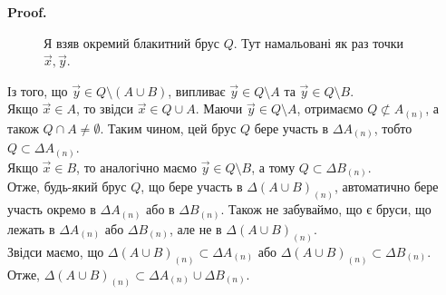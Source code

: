 \documentclass[a4paper, 10pt]{article}
\makeatletter
\def\qed{$\blacksquare$}
\theoremstyle{theoremdd}
\theoremstyle{theoremdd}
\theoremstyle{theoremdd}
\theoremstyle{theoremdd}
\theoremstyle{theoremdd}
\theoremstyle{theoremdd}
\theoremstyle{theoremdd}
\theoremstyle{theoremdd}
\renewenvironment{proof}[1][Proof.\\]{\par
\pushQED{\hfill \qed}%
\normalfont \topsep6\p@\@plus6\p@\relax
\trivlist
\item\relax
{\bfseries
#1\@addpunct{.}}\hspace\labelsep\ignorespaces
}{%
\popQED\endtrivlist\@endpefalse
}
\makeatother
\begin{document}
\begin{proof}
\begin{enumerate}[wide=0pt,label={\arabic*)}]
\begin{figure}[H]
\caption*{Я взяв окремий блакитний брус $Q$. Тут намальовані як раз точки $\vec{x},\vec{y}$.}
\end{figure}

Із того, що $\vec{y} \in Q \setminus (A \cup B)$, випливає $\vec{y} \in Q \setminus A$ та $\vec{y} \in Q \setminus B$.\\
Якщо $\vec{x} \in A$, то звідси $\vec{x} \in Q \cup A$. Маючи $\vec{y} \in Q \setminus A$, отримаємо $Q \not\subset A_{(n)}$, а також $Q \cap A \neq \emptyset$. Таким чином, цей брус $Q$ бере участь в $\Delta A_{(n)}$, тобто $Q \subset \Delta A_{(n)}$.\\
Якщо $\vec{x} \in B$, то аналогічно маємо $\vec{y} \in Q \setminus B$, а тому $Q \subset \Delta B_{(n)}$.\\
Отже, будь-який брус $Q$, що бере участь в $\Delta (A \cup B)_{(n)}$, автоматично бере участь окремо в $\Delta A_{(n)}$ або в $\Delta B_{(n)}$. Також не забуваймо, що є бруси, що лежать в $\Delta A_{(n)}$ або $\Delta B_{(n)}$, але не в $\Delta (A \cup B)_{(n)}$.\\
Звідси маємо, що $\Delta (A \cup B)_{(n)} \subset \Delta A_{(n)}$ або $\Delta (A \cup B)_{(n)} \subset \Delta B_{(n)}$. Отже, $\Delta (A \cup B)_{(n)} \subset \Delta A_{(n)} \cup \Delta B_{(n)}$.


\end{enumerate}
\end{proof}
\end{document}
